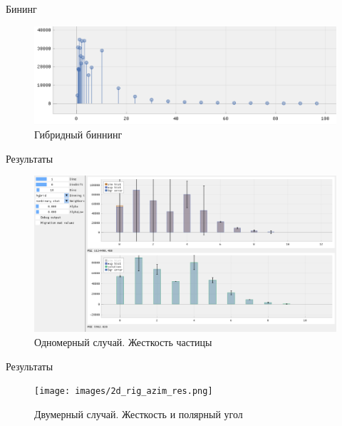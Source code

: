 \documentclass[fullscreen=true,russian,compress,%
	hyperref={unicode,bookmarks=false}]{presentation}
\begin{document}
\begin{frame}{Бининг}
   \begin{figure}[h!]
      \centering
      \includegraphics[width=\linewidth]{images/hybrid_binningpng.png}
      \caption{Гибридный биннинг}
      \label{photo:hybrid_binning}
   \end{figure}

\end{frame}


\begin{frame}{Результаты}
   \begin{figure}[h!]
      \centering
      \includegraphics[width=\linewidth]{images/1d_rig_res.png}
      \caption{Одномерный случай. Жесткость частицы}
   \end{figure}
   
\end{frame}

\begin{frame}{Результаты}
   \begin{figure}[h!]
      \centering
      \texttt{[image: images/2d\_rig\_azim\_res.png]}
      \caption{Двумерный случай. Жесткость и полярный угол}
   \end{figure}
\end{frame}
\end{document}
